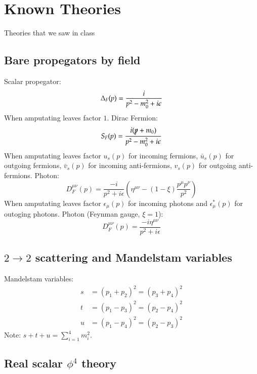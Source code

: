 \documentclass{article}
\begin{document}
\newpage
\section{Known Theories}
Theories that we saw in class
\subsection{Bare propegators by field}
Scalar propegator:
\begin{equation}
    \Delta_F(p) = \frac{i}{p^2 - m_0^2 + i\epsilon} \\
\end{equation}
When amputating leaves factor $1$.
\newline
Dirac Fermion:
\begin{equation}
    S_F(p) = \frac{i(\slashed{p} + m_0)}{p^2 - m_0^2 + i\epsilon} \\
\end{equation}
When amputating leaves factor $u_s(p)$ for incoming fermions, $\bar{u}_s(p)$ for outgoing fermions, $\bar{v}_s(p)$ for incoming anti-fermions, $v_s(p)$ for outgoing anti-fermions.
\newline
Photon:
\begin{equation}
    D_F^{\mu\nu}(p) = \frac{-i}{p^2 + i\epsilon}\left(
        \eta^{\mu\nu} - (1 - \xi)\frac{p^\mu p^\nu}{p^2}
    \right)
\end{equation}
When amputating leaves factor $\epsilon_\mu(p)$ for incoming photons and $\epsilon_\mu^*(p)$ for outoging photons.
\newline
Photon (Feynman gauge, $\xi=1$):
\begin{equation}
    D_F^{\mu\nu}(p) = \frac{-i\eta^{\mu\nu}}{p^2 + i\epsilon}
\end{equation}
\subsection{$2 \rightarrow 2$ scattering and Mandelstam variables}
Mandelstam variables:
\begin{align}
    s &= (p_1 + p_2)^2 = (p_3 + p_4)^2 \\
    t &= (p_1 - p_3)^2 = (p_2 - p_4)^2 \\
    u &= (p_1 - p_4)^2 = (p_2 - p_3)^2
\end{align}
Note: $s + t + u = \sum_{i=1}^4 m_i^2$.
\subsection{Real scalar $\phi^4$ theory}
\end{document}
